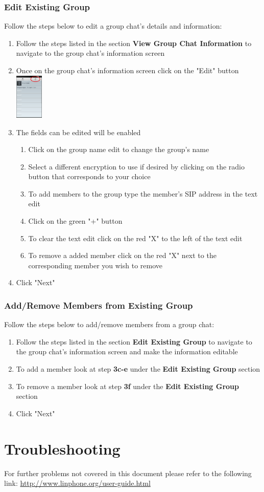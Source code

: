 \documentclass[11pt]{article}
\begin{document}
\subsubsection{Edit Existing Group}  \label{edit}
Follow the steps below to edit a group chat's details and information:
\begin{enumerate}
\item Follow the steps listed in the section \textbf{View Group Chat Information} to navigate to the group chat's information screen
\item Once on the group chat's information screen click on the "Edit" button\\
\includegraphics[width=50px]{images/groupchatInfoEdit.png}
\item The fields can be edited will be enabled
\begin{enumerate}
\item Click on the group name edit to change the group's name
\item Select a different encryption to use if desired by clicking on the radio button that corresponds to your choice
\item To add members to the group type the member's SIP address in the text edit
\item Click on the green "+" button
\item To clear the text edit click on the red "X" to the left of the text edit
\item To remove a added member click on the red "X" next to the corresponding member you wish to remove
\end{enumerate}
\item Click "Next"
\end{enumerate}


\subsubsection{Add/Remove Members from Existing Group}  \label{add}
Follow the steps below to add/remove members from a group chat:
\begin{enumerate}
\item Follow the steps listed in the section \textbf{Edit Existing Group} to navigate to the group chat's information screen and make the information editable
\item To add a member look at step \textbf{3c-e} under the \textbf{Edit Existing Group} section
\item To remove a member look at step \textbf{3f} under the \textbf{Edit Existing Group} section
\item Click "Next"
\end{enumerate}


\section{Troubleshooting}

For further problems not covered in this document please refer to the following link:
\url{http://www.linphone.org/user-guide.html}
\end{document}
